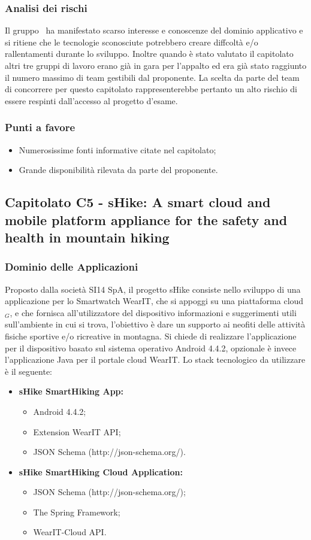   \subsubsection{Analisi dei rischi}
  Il gruppo \gruppo\ ha manifestato scarso interesse e conoscenze del dominio applicativo e si ritiene che le tecnologie sconosciute 
  potrebbero creare diffcoltà e/o rallentamenti durante lo sviluppo.
  Inoltre quando è stato valutato il capitolato altri tre gruppi di lavoro erano già in gara per l'appalto ed era già stato raggiunto il numero massimo di team gestibili dal proponente. La scelta da parte del team di concorrere per questo capitolato rappresenterebbe pertanto un alto rischio di essere respinti dall'accesso al progetto d'esame.
  \subsubsection{Punti a favore}
  \begin{itemize}
  	\item Numerosissime fonti informative citate nel capitolato;
  	\item Grande disponibilità rilevata da parte del proponente.
  \end{itemize}
\newpage
\subsection{Capitolato C5 - sHike: A smart cloud and mobile platform appliance for the safety and health in mountain hiking}
  \subsubsection{Dominio delle Applicazioni}
  Proposto dalla società SI14 SpA, il progetto sHike consiste nello sviluppo di una applicazione per lo Smartwatch WearIT, che si appoggi su una piattaforma cloud$_{G}$, e che fornisca all'utilizzatore del dispositivo informazioni e suggerimenti utili sull'ambiente in cui si trova, l'obiettivo è dare un supporto ai neofiti delle attività fisiche sportive e/o ricreative in montagna. Si chiede di realizzare l'applicazione per il dispositivo basato sul sistema operativo Android 4.4.2, opzionale è invece l'applicazione Java per il portale cloud WearIT. Lo stack tecnologico da utilizzare è il seguente:
  \begin{itemize}
  \item \textbf{sHike SmartHiking App:}
     \begin{itemize}
	     \item Android 4.4.2;
	     \item Extension WearIT API;
		 \item JSON Schema (http://json-schema.org/).
     \end{itemize}
  \item \textbf{sHike SmartHiking Cloud Application:}
     \begin{itemize}
       	\item JSON Schema (http://json-schema.org/);
       	\item The Spring Framework;
	    \item WearIT-Cloud API.
     \end{itemize}
  \end{itemize}
